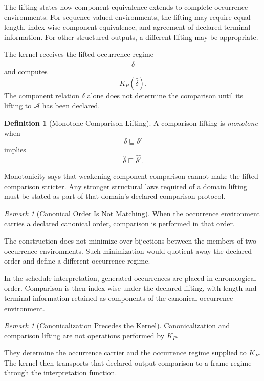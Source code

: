 \documentclass[11pt]{article}
\theoremstyle{plain}
\theoremstyle{definition}
\newtheorem{definition}[theorem]{Definition}
\theoremstyle{remark}
\newtheorem{remark}[theorem]{Remark}
\begin{document}
The lifting states how component equivalence
extends to complete occurrence environments.
For sequence-valued environments,
the lifting may require equal length,
index-wise component equivalence,
and agreement of declared terminal information.
For other structured outputs,
a different lifting may be appropriate.

The kernel receives the lifted occurrence regime
\[
  \widehat{\delta}
\]
and computes
\[
  K_P(\widehat{\delta}).
\]
The component relation \(\delta\) alone
does not determine the comparison
until its lifting to \(\mathcal{A}\) has been declared.

\begin{definition}[Monotone Comparison Lifting]
  \label{ik.def.monotone-lifting}
  A comparison lifting is \emph{monotone}
  when
  \[
    \delta\sqsubseteq\delta'
  \]
  implies
  \[
    \widehat{\delta}
    \sqsubseteq
    \widehat{\delta'}.
  \]
\end{definition}

Monotonicity says that weakening component comparison
cannot make the lifted comparison stricter.
Any stronger structural laws required of a domain lifting
must be stated as part of that domain's declared comparison protocol.

\begin{remark}[Canonical Order Is Not Matching]
  \label{ik.rem.canonical-order}
  When the occurrence environment carries a declared canonical order,
  comparison is performed in that order.

  The construction does not minimize over bijections
  between the members of two occurrence environments.
  Such minimization would quotient away the declared order
  and define a different occurrence regime.

  In the schedule interpretation,
  generated occurrences are placed in chronological order.
  Comparison is then index-wise under the declared lifting,
  with length and terminal information retained
  as components of the canonical occurrence environment.
\end{remark}

\begin{remark}[Canonicalization Precedes the Kernel]
  \label{ik.rem.canonicalization-precedes}
  Canonicalization and comparison lifting
  are not operations performed by \(K_P\).

  They determine the occurrence carrier
  and the occurrence regime supplied to \(K_P\).
  The kernel then transports that declared output comparison
  to a frame regime through the interpretation function.
\end{remark}
\end{document}
